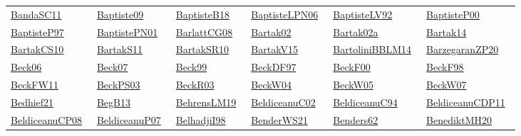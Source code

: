 \begin{longtable}{*{6}{l}}
\href{}{BandaSC11}~\cite{BandaSC11} & \href{works/Baptiste09.pdf}{Baptiste09}~\cite{Baptiste09} & \href{works/BaptisteB18.pdf}{BaptisteB18}~\cite{BaptisteB18} & \href{}{BaptisteLPN06}~\cite{BaptisteLPN06} & \href{works/BaptisteLV92.pdf}{BaptisteLV92}~\cite{BaptisteLV92} & \href{works/BaptisteP00.pdf}{BaptisteP00}~\cite{BaptisteP00}\\ 
\href{works/BaptisteP97.pdf}{BaptisteP97}~\cite{BaptisteP97} & \href{}{BaptistePN01}~\cite{BaptistePN01} & \href{works/BarlattCG08.pdf}{BarlattCG08}~\cite{BarlattCG08} & \href{works/Bartak02.pdf}{Bartak02}~\cite{Bartak02} & \href{works/Bartak02a.pdf}{Bartak02a}~\cite{Bartak02a} & \href{}{Bartak14}~\cite{Bartak14}\\ 
\href{works/BartakCS10.pdf}{BartakCS10}~\cite{BartakCS10} & \href{works/BartakS11.pdf}{BartakS11}~\cite{BartakS11} & \href{works/BartakSR10.pdf}{BartakSR10}~\cite{BartakSR10} & \href{works/BartakV15.pdf}{BartakV15}~\cite{BartakV15} & \href{works/BartoliniBBLM14.pdf}{BartoliniBBLM14}~\cite{BartoliniBBLM14} & \href{works/BarzegaranZP20.pdf}{BarzegaranZP20}~\cite{BarzegaranZP20}\\ 
\href{works/Beck06.pdf}{Beck06}~\cite{Beck06} & \href{works/Beck07.pdf}{Beck07}~\cite{Beck07} & \href{works/Beck99.pdf}{Beck99}~\cite{Beck99} & \href{works/BeckDF97.pdf}{BeckDF97}~\cite{BeckDF97} & \href{works/BeckF00.pdf}{BeckF00}~\cite{BeckF00} & \href{works/BeckF98.pdf}{BeckF98}~\cite{BeckF98}\\ 
\href{works/BeckFW11.pdf}{BeckFW11}~\cite{BeckFW11} & \href{works/BeckPS03.pdf}{BeckPS03}~\cite{BeckPS03} & \href{works/BeckR03.pdf}{BeckR03}~\cite{BeckR03} & \href{works/BeckW04.pdf}{BeckW04}~\cite{BeckW04} & \href{works/BeckW05.pdf}{BeckW05}~\cite{BeckW05} & \href{works/BeckW07.pdf}{BeckW07}~\cite{BeckW07}\\ 
\href{works/Bedhief21.pdf}{Bedhief21}~\cite{Bedhief21} & \href{works/BegB13.pdf}{BegB13}~\cite{BegB13} & \href{works/BehrensLM19.pdf}{BehrensLM19}~\cite{BehrensLM19} & \href{works/BeldiceanuC02.pdf}{BeldiceanuC02}~\cite{BeldiceanuC02} & \href{works/BeldiceanuC94.pdf}{BeldiceanuC94}~\cite{BeldiceanuC94} & \href{works/BeldiceanuCDP11.pdf}{BeldiceanuCDP11}~\cite{BeldiceanuCDP11}\\ 
\href{works/BeldiceanuCP08.pdf}{BeldiceanuCP08}~\cite{BeldiceanuCP08} & \href{works/BeldiceanuP07.pdf}{BeldiceanuP07}~\cite{BeldiceanuP07} & \href{works/BelhadjiI98.pdf}{BelhadjiI98}~\cite{BelhadjiI98} & \href{works/BenderWS21.pdf}{BenderWS21}~\cite{BenderWS21} & \href{}{Benders62}~\cite{Benders62} & \href{works/BenediktMH20.pdf}{BenediktMH20}~\cite{BenediktMH20}\\ 

\end{longtable}
